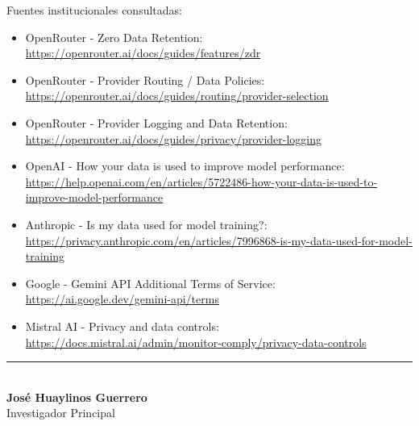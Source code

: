 \documentclass[12pt,a4paper]{article}
\begin{document}
Fuentes institucionales consultadas:
\begin{itemize}
    \item OpenRouter - Zero Data Retention: \url{https://openrouter.ai/docs/guides/features/zdr}
    \item OpenRouter - Provider Routing / Data Policies: \url{https://openrouter.ai/docs/guides/routing/provider-selection}
    \item OpenRouter - Provider Logging and Data Retention: \url{https://openrouter.ai/docs/guides/privacy/provider-logging}
    \item OpenAI - How your data is used to improve model performance: \url{https://help.openai.com/en/articles/5722486-how-your-data-is-used-to-improve-model-performance}
    \item Anthropic - Is my data used for model training?: \url{https://privacy.anthropic.com/en/articles/7996868-is-my-data-used-for-model-training}
    \item Google - Gemini API Additional Terms of Service: \url{https://ai.google.dev/gemini-api/terms}
    \item Mistral AI - Privacy and data controls: \url{https://docs.mistral.ai/admin/monitor-comply/privacy-data-controls}
\end{itemize}

\vspace{1cm}

\begin{center}
\rule{8cm}{0.4pt}\\
\textbf{José Huaylinos Guerrero}\\
Investigador Principal
\end{center}
\end{document}
